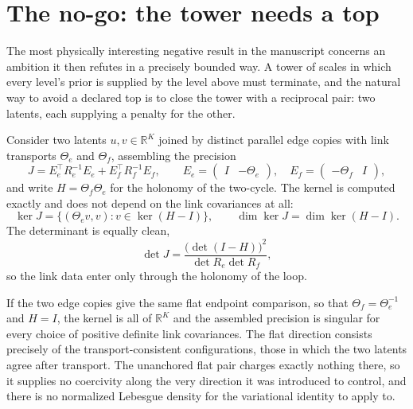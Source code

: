 \documentclass[11pt,letterpaper]{article}
\begin{document}
\section{The no-go: the tower needs a top}
\label{sec:nogo}

The most physically interesting negative result in the manuscript concerns an ambition it then refutes in a precisely bounded way. A tower of scales in which every level's prior is supplied by the level above must terminate, and the natural way to avoid a declared top is to close the tower with a reciprocal pair: two latents, each supplying a penalty for the other.

Consider two latents \(u,v\in\mathbb R^K\) joined by distinct parallel edge copies with link transports \(\Theta_e\) and \(\Theta_f\), assembling the precision
\begin{equation}
  J=E_e^\top R_e^{-1}E_e+E_f^\top R_f^{-1}E_f,
  \qquad
  E_e=\begin{pmatrix}I&-\Theta_e\end{pmatrix},
  \quad
  E_f=\begin{pmatrix}-\Theta_f&I\end{pmatrix},
  \label{eq:pair-precision}
\end{equation}
and write \(H=\Theta_f\Theta_e\) for the holonomy of the two-cycle. The kernel is computed exactly and does not depend on the link covariances at all:
\begin{equation}
  \ker J=\bigl\{(\Theta_ev,v):v\in\ker(H-I)\bigr\},
  \qquad
  \dim\ker J=\dim\ker(H-I).
  \label{eq:pair-kernel}
\end{equation}
The determinant is equally clean,
\begin{equation}
  \det J=\frac{\bigl(\det(I-H)\bigr)^2}{\det R_e\det R_f},
  \label{eq:det-holonomy}
\end{equation}
so the link data enter only through the holonomy of the loop.

If the two edge copies give the same flat endpoint comparison, so that \(\Theta_f=\Theta_e^{-1}\) and \(H=I\), the kernel is all of \(\mathbb R^K\) and the assembled precision is singular for every choice of positive definite link covariances. The flat direction consists precisely of the transport-consistent configurations, those in which the two latents agree after transport. The unanchored flat pair charges exactly nothing there, so it supplies no coercivity along the very direction it was introduced to control, and there is no normalized Lebesgue density for the variational identity to apply to.
\end{document}
